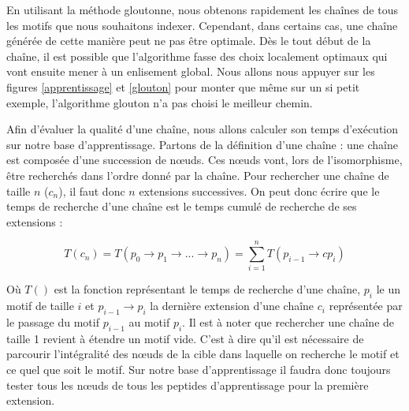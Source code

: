 \label{index_markov}

En utilisant la méthode gloutonne, nous obtenons rapidement les chaînes de tous les motifs que nous souhaitons indexer.
Cependant, dans certains cas, une chaîne générée de cette manière peut ne pas être optimale.
Dès le tout début de la chaîne, il est possible que l'algorithme fasse des choix localement optimaux qui vont ensuite mener à un enlisement global.
Nous allons nous appuyer sur les figures \ref{apprentissage} et \ref{glouton} pour monter que même sur un si petit exemple, l'algorithme glouton n'a pas choisi le meilleur chemin.

Afin d'évaluer la qualité d'une chaîne, nous allons calculer son temps d'exécution sur notre base d'apprentissage.
Partons de la définition d'une chaîne : une chaîne est composée d'une succession de n\oe{}uds.
Ces n\oe{}uds vont, lors de l'isomorphisme, être recherchés dans l'ordre donné par la chaîne.
Pour rechercher une chaîne de taille $n$ ($c_n$), il faut donc $n$ extensions successives.
On peut donc écrire que le temps de recherche d'une chaîne est le temps cumulé de recherche de ses extensions :

\begin{equation}
 T(c_n) = T(p_0 \rightarrow p_1 \rightarrow ... \rightarrow p_n) = \sum_{i=1}^n T(p_{i-1} \rightarrow cp_i)
\end{equation}

Où $T()$ est la fonction représentant le temps de recherche d'une chaîne, $p_i$ le un motif de taille $i$ et $p_{i-1} \rightarrow p_i$ la dernière extension d'une chaîne $c_i$ représentée par le passage du motif $p_{i-1}$ au motif $p_i$.
Il est à noter que rechercher une chaîne de taille 1 revient à étendre un motif vide.
C'est à dire qu'il est nécessaire de parcourir l'intégralité des n\oe{}uds de la cible dans laquelle on recherche le motif et ce quel que soit le motif.
Sur notre base d'apprentissage il faudra donc toujours tester tous les n\oe{}uds de tous les peptides d'apprentissage pour la première extension.
% 

